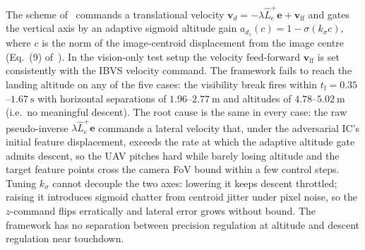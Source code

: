 \documentclass[10pt,journal]{IEEEtran}
\begin{document}
The scheme of~\cite{cho2022} commands a translational velocity $\boldsymbol{v}_d = -\lambda\hat{L}_e^+\boldsymbol{e} + \boldsymbol{v}_{\text{ff}}$ and gates the vertical axis by an adaptive sigmoid altitude gain $a_{d_z}(c) = 1 - \sigma(k_\sigma c)$, where $c$ is the norm of the image-centroid displacement from the image centre (Eq.~(9) of~\cite{cho2022}). In the vision-only test setup the velocity feed-forward $\boldsymbol{v}_{\text{ff}}$ is set consistently with the IBVS velocity command. The framework fails to reach the landing altitude on any of the five cases: the visibility break fires within $t_\text{f}=0.35$--$1.67~\text{s}$ with horizontal separations of $1.96$--$2.77~\text{m}$ and altitudes of $4.78$--$5.02~\text{m}$ (i.e.\ no meaningful descent). The root cause is the same in every case: the raw pseudo-inverse $\lambda\hat{L}_e^+\boldsymbol{e}$ commands a lateral velocity that, under the adversarial IC's initial feature displacement, exceeds the rate at which the adaptive altitude gate admits descent, so the UAV pitches hard while barely losing altitude and the target feature points cross the camera FoV bound within a few control steps. Tuning $k_\sigma$ cannot decouple the two axes: lowering it keeps descent throttled; raising it introduces sigmoid chatter from centroid jitter under pixel noise, so the $z$-command flips erratically and lateral error grows without bound. The framework has no separation between precision regulation at altitude and descent regulation near touchdown.

\clearpage
\end{document}
